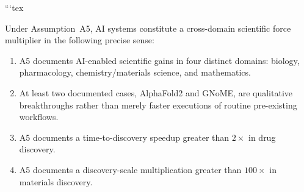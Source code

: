 ```tex
\begin{theorem}
  Under Assumption~A5, AI systems constitute a cross-domain scientific
  force multiplier in the following precise sense:
  \begin{enumerate}
    \item[(a)] A5 documents AI-enabled scientific gains in four distinct
    domains: biology, pharmacology, chemistry/materials science, and
    mathematics.
    \item[(b)] At least two documented cases, AlphaFold2 and GNoME, are
    qualitative breakthroughs rather than merely faster executions of
    routine pre-existing workflows.
    \item[(c)] A5 documents a time-to-discovery speedup greater than
    $2\times$ in drug discovery.
    \item[(d)] A5 documents a discovery-scale multiplication greater than
    $100\times$ in materials discovery.
  \end{enumerate}
\end{theorem}

